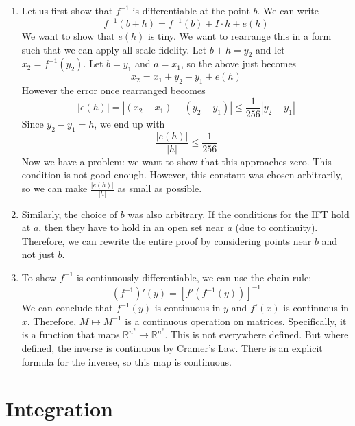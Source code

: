 \documentclass{article}
\begin{document}
\begin{enumerate}
    \item Let us first show that $f^{-1}$ is differentiable at the point $b$. We can write
          \begin{equation}
              f^{-1}(b+h) = f^{-1}(b) + I\cdot h + e(h)
          \end{equation}
          We want to show that $e(h)$ is tiny. We want to rearrange this in a form such that we can apply all scale fidelity. Let $b+h = y_2$ and let $x_2=f^{-1}(y_2).$ Let $b=y_1$ and $a=x_1$, so the above just becomes
          \begin{equation}
              x_2 = x_1 + y_2-y_1 + e(h)
          \end{equation}
          However the error once rearranged becomes
          \begin{equation}
              |e(h)| = |(x_2-x_1)-(y_2-y_1)| \le \frac{1}{256}|y_2-y_1|
          \end{equation}
          Since $y_2-y_1=h$, we end up with
          \begin{equation}
              \frac{|e(h)|}{|h|} \le \frac{1}{256}
          \end{equation}
          Now we have a problem: we want to show that this approaches zero. This condition is not good enough. However, this constant was chosen arbitrarily, so we can make $\frac{|e(h)|}{|h|}$ as small as possible.
    \item Similarly, the choice of $b$ was also arbitrary. If the conditions for the IFT hold at $a$, then they have to hold in an open set near $a$ (due to continuity). Therefore, we can rewrite the entire proof by considering points near $b$ and not just $b$.
    \item To show $f^{-1}$ is continuously differentiable, we can use the chain rule:
          \begin{equation}
              (f^{-1})'(y) = [f'(f^{-1}(y))]^{-1}
          \end{equation}
          We can conclude that $f^{-1}(y)$ is continuous in $y$ and $f'(x)$ is continuous in $x$. Therefore, $M \mapsto M^{-1}$ is a continuous operation on matrices. Specifically, it is a function that maps $\mathbb{R}^{n^2}\rightarrow \mathbb{R}^{n^2}.$ This is not everywhere defined. But where defined, the inverse is continuous by Cramer's Law. There is an explicit formula for the inverse, so this map is continuous.
\end{enumerate}

\newpage
\section{Integration}
\end{document}
